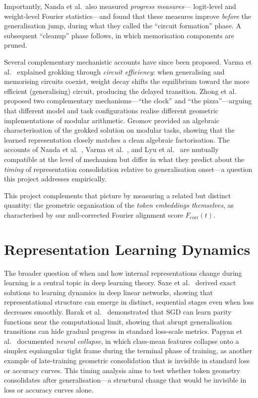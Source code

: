 \documentclass[12pt,openany,a4paper]{book}
\newcommand{\fcorr}{F_{\mathrm{corr}}}
\begin{document}
Importantly, Nanda et al.\ also measured \emph{progress measures}---
logit-level and weight-level Fourier statistics---and found that these
measures improve \emph{before} the generalisation jump, during what
they called the ``circuit formation'' phase.
A subsequent ``cleanup'' phase follows, in which memorisation
components are pruned.

Several complementary mechanistic accounts have since been proposed.
Varma et al.\ \cite{varma2023explaining} explained grokking through
\emph{circuit efficiency}: when generalising and memorising circuits
coexist, weight decay shifts the equilibrium toward the more
efficient (generalising) circuit, producing the delayed transition.
Zhong et al.\ \cite{zhong2023clock} proposed two complementary
mechanisms---``the clock'' and ``the pizza''---arguing that
different model and task configurations realise different geometric
implementations of modular arithmetic.
Gromov \cite{gromov2023grokking} provided an algebraic
characterisation of the grokked solution on modular tasks,
showing that the learned representation closely matches a clean
algebraic factorisation.
The accounts of Nanda et al.\ \cite{nanda2023progress},
Varma et al.\ \cite{varma2023explaining}, and
Lyu et al.\ \cite{lyu2024dichotomy} are mutually compatible at the
level of mechanism but differ in what they predict about the
\emph{timing} of representation consolidation relative to
generalisation onset---a question this project addresses
empirically.

This project complements that picture by measuring a
related but distinct quantity: the geometric organisation of the
\emph{token embeddings themselves}, as characterised by our
null-corrected Fourier alignment score $\fcorr(t)$.

\section{Representation Learning Dynamics}

The broader question of when and how internal representations change
during learning is a central topic in deep learning theory.
Saxe et al.\ \cite{saxe2014exact} derived exact solutions to learning
dynamics in deep linear networks, showing that representational
structure can emerge in distinct, sequential stages even when loss
decreases smoothly.
Barak et al.\ \cite{barak2022hidden} demonstrated that SGD can learn
parity functions near the computational limit, showing that abrupt
generalisation transitions can hide gradual progress in standard
loss-scale metrics.
Papyan et al.\ \cite{papyan2020prevalence} documented \emph{neural
collapse}, in which class-mean features collapse onto a simplex
equiangular tight frame during the terminal phase of training, as
another example of late-training geometric consolidation that is
invisible in standard loss or accuracy curves.
This timing analysis aims to test whether token geometry consolidates
after generalisation---a structural change that would be invisible
in loss or accuracy curves alone.
\end{document}
